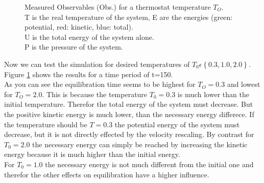 \begin{figure}[ht]
\begin{subfigure}{0.3\textwidth}
\end{subfigure}

\caption{
Measured Observables (Obs.) for a thermostat temperature $T_O$.\\
T is the real temperature of the system, E are the energies (green: potential, red: kinetic, blue: total).\\
U is the total energy of the system alone.\\
P is the pressure of the system.}
\label{fig4}
\end{figure}


Now we can test the simulation for desired temperatures of  $T_0\epsilon\left\lbrace 0.3,1.0,2.0\right\rbrace $. Figure \ref{fig4} shows the results for a time period of t=150.\\

As you can see the equilibration time seems to be highest for $T_O=0.3$ and lowest for $T_O=2.0$. 
This is because the temperature $T_0=0.3$ is much lower than the initial temperature. 
Therefor the total energy of the system must decrease. But the positive kinetic energy is much lower, than the necessary energy differece. 
If the temperature should be $T=0.3$ the potential energy of the system must decrease, but it is not directly effected by the velocity rescaling.
By contrast for $T_0=2.0$ the necessary energy can simply  be reached by increasing the kinetic energy because it is much higher than the initial energy.\\

For $T_0=1.0$ the necessary energy is not much different from the initial one and therefor the other effects on equilibration have a higher influence.